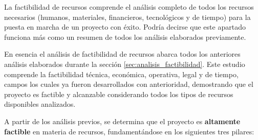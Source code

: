 La factibilidad de recursos comprende el análisis completo de todos los recursos necesarios (humanos, materiales, financieros, tecnológicos y de tiempo) para la puesta en marcha de un proyecto  con éxito. Podría decirse que este apartado funciona más como un resumen de todos los análisis elaborados previamente. 

En esencia el análisis de factibilidad de recursos abarca todos los anteriores análisis elaborados durante la sección \ref{sec:analisis_factibilidad}. Este estudio comprende la factibilidad técnica, económica, operativa, legal y de tiempo, campos los cuales ya fueron desarrollados con anterioridad, demostrando que el proyecto es factible y alcanzable considerando todos los tipos de recursos disponibles analizados. 

A partir de los análisis previos, se determina que el proyecto es \textbf{altamente factible} en materia de recursos, fundamentándose en los siguientes tres pilares:


